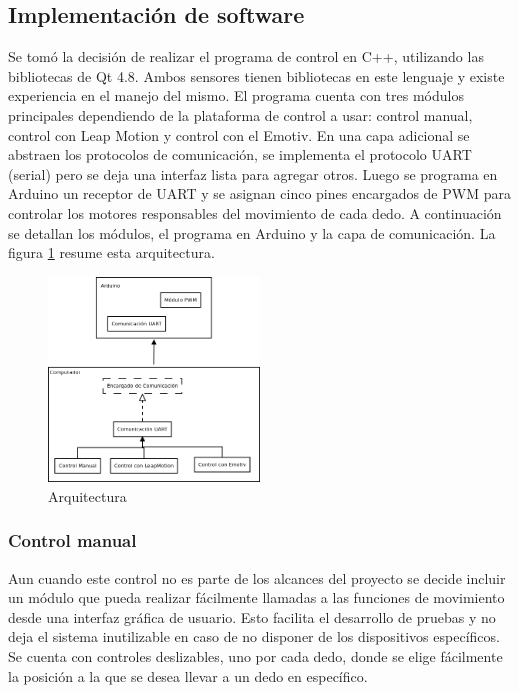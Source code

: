 \documentclass[letterpaper,journal,transmag]{IEEEtran}
\begin{document}
\subsection{Implementación de software}
Se tomó la decisión de realizar el programa de control en C++, utilizando las
bibliotecas de Qt 4.8. Ambos sensores tienen bibliotecas en este lenguaje y
existe experiencia en el manejo del mismo. El programa cuenta con tres módulos
principales dependiendo de la plataforma de control a usar: control manual,
control con Leap Motion y control con el Emotiv. En una capa adicional se
abstraen los protocolos de comunicación, se implementa el protocolo UART
(serial) pero se deja una interfaz lista para agregar otros. Luego se programa
en Arduino un receptor de UART y se asignan cinco pines encargados de PWM para
controlar los motores responsables del movimiento de cada dedo. A continuación
se detallan los módulos, el programa en Arduino y la capa de comunicación. La
figura \ref{fig:arquitectura} resume esta arquitectura.\\
      \begin{figure}[ht]
         \includegraphics[width=0.5\textwidth]{Arquitectura}
         \caption{Arquitectura}
         \label{fig:arquitectura}
      \end{figure}
\subsubsection{Control manual}
Aun cuando este control no es parte de los alcances del proyecto se decide
incluir un módulo que pueda realizar fácilmente llamadas a las funciones de
movimiento desde una interfaz gráfica de usuario. Esto facilita el desarrollo
de pruebas y no deja el sistema inutilizable en caso de no disponer de los
dispositivos específicos. Se cuenta con controles deslizables, uno por cada
dedo, donde se elige fácilmente la posición a la que se desea llevar a un dedo
en específico.\\
\end{document}
